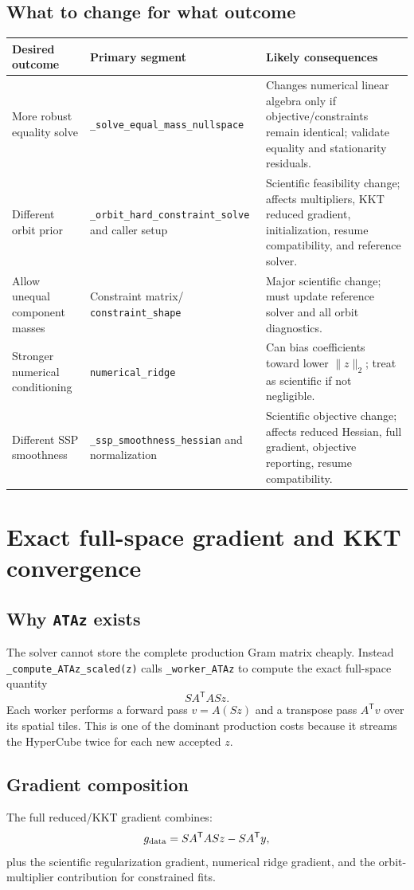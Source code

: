 \documentclass[10pt,a4paper]{article}
\newcommand{\code}[1]{\texttt{#1}}
\begin{document}
\subsection{What to change for what outcome}
\begin{longtable}{p{}p{}p{}}
\toprule
\textbf{Desired outcome} & \textbf{Primary segment} & \textbf{Likely consequences}\\
\midrule\endhead
More robust equality solve & \code{\_solve\_equal\_mass\_nullspace} & Changes numerical linear algebra only if objective/constraints remain identical; validate equality and stationarity residuals.\\
Different orbit prior & \code{\_orbit\_hard\_constraint\_solve} and caller setup & Scientific feasibility change; affects multipliers, KKT reduced gradient, initialization, resume compatibility, and reference solver.\\
Allow unequal component masses & Constraint matrix/ \code{constraint\_shape} & Major scientific change; must update reference solver and all orbit diagnostics.\\
Stronger numerical conditioning & \code{numerical\_ridge} & Can bias coefficients toward lower $\lVert z\rVert_2$; treat as scientific if not negligible.\\
Different SSP smoothness & \code{\_ssp\_smoothness\_hessian} and normalization & Scientific objective change; affects reduced Hessian, full gradient, objective reporting, resume compatibility.\\
\bottomrule
\end{longtable}

\section{Exact full-space gradient and KKT convergence}
\subsection{Why \code{ATAz} exists}
The solver cannot store the complete production Gram matrix cheaply. Instead \code{\_compute\_ATAz\_scaled(z)} calls \code{\_worker\_ATAz} to compute the exact full-space quantity
\[
SA^{\mathsf T}ASz.
\]
Each worker performs a forward pass $v=A(Sz)$ and a transpose pass $A^{\mathsf T}v$ over its spatial tiles. This is one of the dominant production costs because it streams the HyperCube twice for each new accepted $z$.

\subsection{Gradient composition}
The full reduced/KKT gradient combines:
\[
g_{\rm data}=SA^{\mathsf T}ASz-SA^{\mathsf T}y,
\]
plus the scientific regularization gradient, numerical ridge gradient, and the orbit-multiplier contribution for constrained fits.
\end{document}
